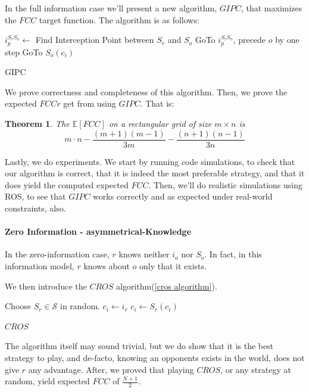 \documentclass[a4paper,english,10pt]{article}
\newtheorem{theorem}{Theorem}[section]
\newcommand\rob{\ensuremath{r}\xspace}
\newcommand\opp{\ensuremath{o}\xspace}
\newcommand{\fcc}{\ensuremath{FCC}\xspace}
\newcommand{\cros}{\ensuremath{CROS}\xspace}
\begin{document}
In the full information case we'll present a new algorithm, $GIPC$, that maximizes the \fcc target function.
The algorithm is as follows:
\begin{algorithm}
\begin{algorithmic}
	\STATE $i_p^{S_\rob S_\opp} \leftarrow $ Find Interception Point between $S_\rob$ and $S_\opp$
    \STATE GoTo $i_p^{S_\rob S_\opp}$, precede \opp by one step
    \LOOP
        	\STATE GoTo $S_\opp(c_i)$
        \ENDIF
    \ENDLOOP
  
\end{algorithmic}
\caption{GIPC\label{lss}}
\end{algorithm}

We prove correctness and completeness of this algorithm. Then, we prove the expected \fcc \rob get from using $GIPC$. That is:
\begin{theorem}
The $\mathbb{E}[\fcc]$ on a rectangular grid of size $m\times n$ is \[m\cdot n-\frac{\left(m+1\right)\left(m-1\right)}{3m}-\frac{\left(n+1\right)\left(n-1\right)}{3n}\] 
\end{theorem}

Lastly, we do experiments. We start by running code simulations, to check that our algorithm is correct, that it is indeed the most preferable strategy, and that it does yield the computed expected \fcc.
Then, we'll do realistic simulations using ROS, to see that $GIPC$ works correctly and as expected under real-world constraints, also.

\paragraph{Zero Information - asymmetrical-Knowledge}
In the zero-information case, \rob knows neither $i_\opp$ nor $S_\opp$. In fact, in this information model, \rob knows about \opp only that it exists.

We then introduce the \cros algorithm(\ref{cros algorithm}). 
\begin{algorithm}
\begin{algorithmic}
	\STATE Choose $S_\rob \in \mathcal{S}$ in random.
    \STATE $c_i \leftarrow i_\rob$
    \LOOP
    	\STATE $c_i \leftarrow S_\rob(c_i)$
    \ENDLOOP
  
\end{algorithmic}
\caption{\cros\label{cros algorithm}}
\end{algorithm}

The algorithm itself may sound trivial, but we do show that it is the best strategy to play, and de-facto, knowing an opponents exists in the world, does not give \rob any advantage. After, we proved that playing \cros, or any strategy at random, yield expected \fcc of $\frac{N+1}{2}$.
\end{document}
